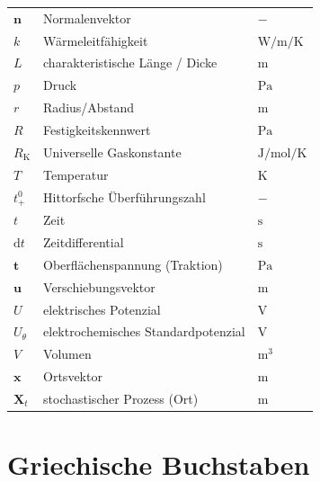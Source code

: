 {\begin{longtable}{@{}p{\TabulatorVZ}@{}p{\TabulatorTX}p{\TabulatorEH}@{}}
    $\boldsymbol{n}	$	& Normalenvektor					& $-$\\	
	$k$                 & Wärmeleitfähigkeit                & $\si{\watt\per\metre\per\kelvin}$\\
	$L$                 & charakteristische Länge / Dicke   & $\si{\metre}$ \\
	$p$                 & Druck						        & $\si{\pascal}$\\
	$r$					& Radius/Abstand					& $\si{\metre}$\\
	$R$                 & Festigkeitskennwert               & $\si{\pascal}$ \\
	$R_{\text{K}}$		& Universelle Gaskonstante	        & $\si{\joule\per\mole\per\kelvin}$\\
	$T$					& Temperatur				        & $\si{\kelvin}$\\
	$t^0_+$				& Hittorfsche Überführungszahl      & $-$\\
	$t$					& Zeit						        & $\si{\second}$\\
	$\text{d}t$         & Zeitdifferential                  & $\si{\second}$ \\
	$\boldsymbol{t}$    & Oberflächenspannung (Traktion)    & $\si{\pascal}$ \\
	$\boldsymbol{u}$    & Verschiebungsvektor               & $\si{\metre}$ \\
	$U$					& elektrisches Potenzial				& $\si{\volt}$\\
	$U_{\theta}$ 		& elektrochemisches Standardpotenzial	& $\si{\volt}$\\
	$V$					& Volumen					        & $\si{\cubic\metre}$\\
    $\boldsymbol{x}$    & Ortsvektor                        & $\si{\metre}$ \\
	$\boldsymbol{X}_t$  & stochastischer Prozess (Ort)      & $\si{\metre}$
\end{longtable}

\section*{Griechische Buchstaben}

}
